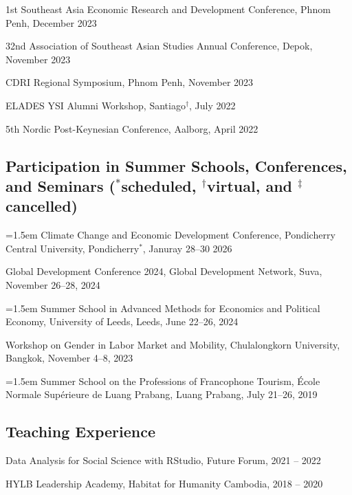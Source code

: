 \documentclass[10pt,a4paper]{article}
\begin{document}
1st Southeast Asia Economic Research and Development Conference, Phnom Penh, December 2023

32nd Association of Southeast Asian Studies Annual Conference, Depok, November 2023

CDRI Regional Symposium, Phnom Penh, November 2023

ELADES YSI Alumni Workshop, Santiago$^\dag$, July 2022

5th Nordic Post-Keynesian Conference, Aalborg, April 2022

\subsection*{Participation in Summer Schools, Conferences, and Seminars ($^\ast$scheduled, $^\dag$virtual, and $^\ddag$cancelled)}

\hangindent=1.5em
Climate Change and Economic Development Conference, Pondicherry Central University, Pondicherry$^\ast$, Januray 28--30 2026 

Global Development Conference 2024, Global Development Network, Suva, November 26--28, 2024 

\hangindent=1.5em
Summer School in Advanced Methods for Economics and Political Economy, University of Leeds, Leeds, June 22--26, 2024

Workshop on Gender in Labor Market and Mobility, Chulalongkorn University, Bangkok, November 4--8, 2023

\hangindent=1.5em
Summer School on the Professions of Francophone Tourism, École Normale Supérieure de Luang Prabang, Luang Prabang, July 21–26, 2019


\subsection*{Teaching Experience}

Data Analysis for Social Science with RStudio, Future Forum, 2021 -- 2022

HYLB Leadership Academy, Habitat for Humanity Cambodia, 2018 -- 2020
\end{document}
